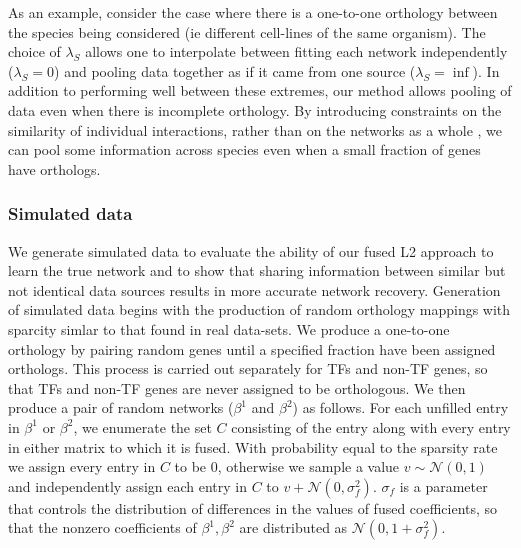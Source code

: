 \documentclass[11pt]{article}
\begin{document}
As an example, consider the case where there is a one-to-one orthology between the species being considered (ie different cell-lines of the same organism). 
The choice of $\lambda_S$ allows one to interpolate between fitting each network independently ($\lambda_S=0$) and pooling data together as if it came from one source ($\lambda_S=\inf$). 
In addition to performing well between these extremes, our method allows pooling of data even when there is incomplete orthology. 
By introducing constraints on the similarity of individual interactions, rather than on the networks as a whole \cite{parikh2011treegl}, we can pool some information across species even when a small fraction of genes have orthologs. 


\subsubsection{Simulated data}
We generate simulated data to evaluate the ability of our fused L2 approach to learn the true network and to show that sharing information between similar but not identical data sources results in more accurate network recovery. 
Generation of simulated data begins with the production of random orthology mappings with sparcity simlar to that found in real data-sets. 
We produce a one-to-one orthology by pairing random genes until a specified fraction have been assigned orthologs. 
This process is carried out separately for TFs and non-TF genes, so that TFs and non-TF genes are never assigned to be orthologous. 
We then produce a pair of random networks ($\beta^1$ and $\beta^2$) as follows. For each unfilled entry in $\beta^1$ or $\beta^2$, we enumerate the set $C$ consisting of the entry along with every entry in either matrix to which it is fused. 
With probability equal to the sparsity rate we assign every entry in $C$ to be 0, otherwise we sample a value $v \sim \mathcal{N}(0,1)$ and independently assign each entry in $C$ to $v + \mathcal{N}(0, \sigma_f^2)$. $\sigma_f$ is a parameter that controls the distribution of differences in the values of fused coefficients, so that the nonzero coefficients of $\beta^1, \beta^2$ are distributed as $\mathcal{N}(0, 1 + \sigma_f^2)$.
\end{document}
